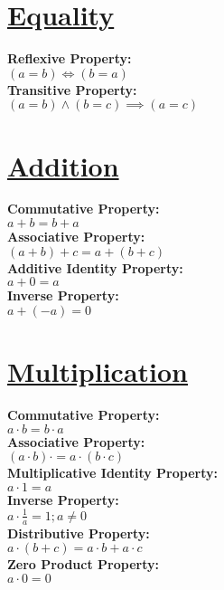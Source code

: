 \documentclass[12pt]{article}
\begin{document}
\twocolumn

\section*{\underline{\textbf{Equality}}}
\textbf{Reflexive Property:}
    \\ \( (a = b) \iff (b = a) \)
\\ \textbf{Transitive Property:}
    \\ \( (a = b) \land (b = c) \implies (a = c) \)



\section*{\underline{\textbf{Addition}}}
\textbf{Commutative Property:}
    \\ \( a + b = b + a \)
\\ \textbf{Associative Property:}
    \\ \( (a + b) + c = a + (b + c) \)
\\ \textbf{Additive Identity Property:}
    \\ \( a + 0 = a \)
\\ \textbf{Inverse Property:}
    \\ \( a + (-a) = 0 \)



\section*{\underline{\textbf{Multiplication}}}
\textbf{Commutative Property:}
    \\ \( a \cdot b = b \cdot a \)
\\ \textbf{Associative Property:}
    \\ \( (a \cdot b) \cdot = a \cdot (b \cdot c) \)
\\ \textbf{Multiplicative Identity Property:}
    \\ \( a \cdot 1 = a \)
\\ \textbf{Inverse Property:}
    \\ \( a \cdot \displaystyle\frac{ 1 }{ a } = 1 ; a \ne 0 \)
\\ \textbf{Distributive Property:}
    \\ \( a \cdot (b + c) = a \cdot b + a \cdot c \)
\\ \textbf{Zero Product Property:}
    \\ \( a \cdot 0 = 0 \)
\end{document}
